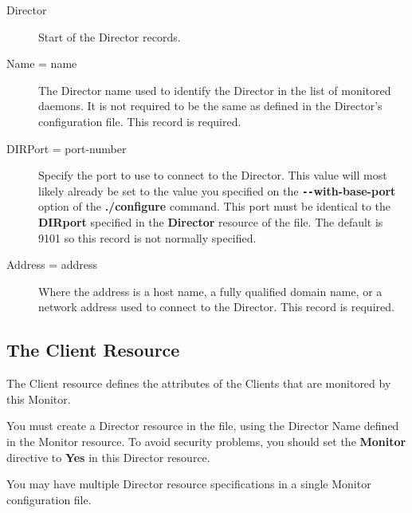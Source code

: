 \begin{description}

\item [Director]
   Start of the Director records. 

\item [Name = \lt{}name\gt{}]
   The Director name used to identify  the Director in the list of monitored
daemons. It is not required  to be the same as defined in the Director's
configuration file.  This record is required. 

\item [DIRPort = \lt{}port-number\gt{}]
   Specify the port to use to connect  to the Director. This value will most
likely already be set to the value  you specified on the {\bf
\verb{--{with-base-port} option of the  {\bf ./configure} command. This port must be
identical to the  {\bf DIRport} specified in the {\bf Director} resource of
the 
 file.  The
default is 9101 so this record is not normally specified. 

\item [Address = \lt{}address\gt{}]
   Where the address is a host name,  a fully qualified domain name, or a network
address used to connect  to the Director.  This record is required. 
\end{description}

\subsection*{The Client Resource}
\label{ClientResource1}

The Client resource defines the attributes of the Clients that are monitored
by this Monitor.

You must create a Director resource in the 
 file, using the
Director Name defined in the Monitor resource. To avoid security problems, you
should set the {\bf Monitor} directive to {\bf Yes} in this Director resource.


You may have multiple Director resource specifications in a single Monitor
configuration file. 

